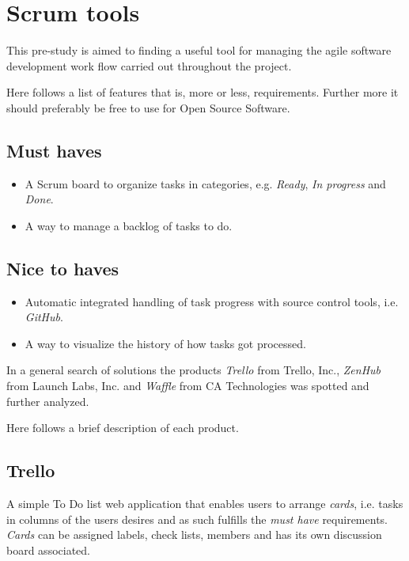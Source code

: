 \section{Scrum tools}\label{preStudy:scrum}
This pre-study is aimed to finding a useful tool for managing the agile software development work flow carried out throughout the project.

Here follows a list of features that is, more or less, requirements. Further more it should preferably be free to use for Open Source Software.

\subsection*{Must haves}
\begin{itemize}
\item A Scrum board to organize tasks in categories, e.g. \textit{Ready}, \textit{In progress} and \textit{Done}.
\item A way to manage a backlog of tasks to do.
\end{itemize}

\subsection*{Nice to haves}
\begin{itemize}
\item Automatic integrated handling of task progress with source control tools, i.e. \textit{GitHub}.
\item A way to visualize the history of how tasks got processed.
\end{itemize}

In a general search of solutions the products \textit{Trello} from Trello, Inc., \textit{ZenHub} from Launch Labs, Inc. and \textit{Waffle} from CA Technologies was spotted and further analyzed.

Here follows a brief description of each product.

\subsection*{Trello}
A simple To Do list web application that enables users to arrange \textit{cards}, i.e. tasks in columns of the users desires and as such fulfills the \textit{must have} requirements.
\textit{Cards} can be assigned labels, check lists, members and has its own discussion board associated.

